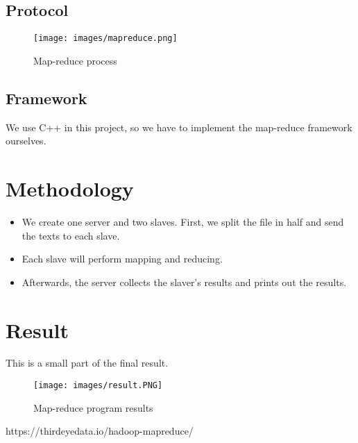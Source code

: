 \documentclass[13pt]{article}
\begin{document}
\subsection{Protocol}
\begin{figure}[h]
    \centering
    \texttt{[image: images/mapreduce.png]}
    \caption{Map-reduce process\cite{Map reduce process}}
    \label{fig:protocol}
\end{figure}

\subsection{Framework}
\noindent%
We use C++ in this project, so we have to implement the map-reduce framework ourselves.

\section{Methodology}
\begin{itemize}
    \item We create one server and two slaves. First, we split the file in half and send the texts to each slave.
    \item Each slave will perform mapping and reducing. 
    \item Afterwards, the server collects the slaver's results and prints out the results.
\end{itemize}

\section{Result}
\noindent%
This is a small part of the final result.
\begin{figure}[h]
    \centering
    \texttt{[image: images/result.PNG]}
    \caption{Map-reduce program results}
    \label{fig:protocol}
\end{figure}

\begin{thebibliography}{9}
https://thirdeyedata.io/hadoop-mapreduce/
\end{thebibliography}
\end{document}
